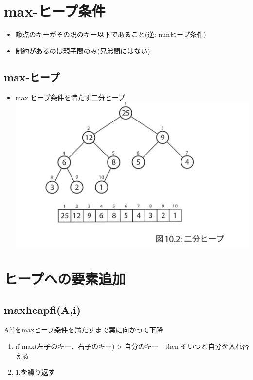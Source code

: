 \documentclass[a4paper,dvipdfmx]{jsarticle}
\makeatletter
\def\maxwidth{\ifdim\Gin@nat@width>\linewidth\linewidth
    \else\Gin@nat@width\fi}
\let\Oldincludegraphics\includegraphics
\renewcommand{\includegraphics}[1]{\Oldincludegraphics[width=.8\maxwidth]{#1}}
\providecommand{\tightlist}{%
      \setlength{\itemsep}{0pt}\setlength{\parskip}{0pt}}
\makeatother
\begin{document}
    \section{max-ヒープ条件}\label{max-ux30d2ux30fcux30d7ux6761ux4ef6}

\begin{itemize}
\tightlist
\item
  節点のキーがその親のキー以下であること(逆: minヒープ条件)
\item
  制約があるのは親子間のみ(兄弟間にはない)
\end{itemize}

\subsection{max-ヒープ}\label{max-ux30d2ux30fcux30d7}

\begin{itemize}
\tightlist
\item
  max ヒープ条件を満たす二分ヒープ \includegraphics{./imgs/BH.png}
\end{itemize}

    \section{ヒープへの要素追加}\label{ux30d2ux30fcux30d7ux3078ux306eux8981ux7d20ux8ffdux52a0}

\subsection{maxheapfi(A,i)}\label{maxheapfiai}

A{[}i{]}をmaxヒープ条件を満たすまで葉に向かって下降

\begin{enumerate}
\def\labelenumi{\arabic{enumi}.}
\tightlist
\item
  if max(左子のキー、右子のキー) \textgreater{} 自分のキー　then
  そいつと自分を入れ替える
\item
  1.を繰り返す
\end{enumerate}
\end{document}
